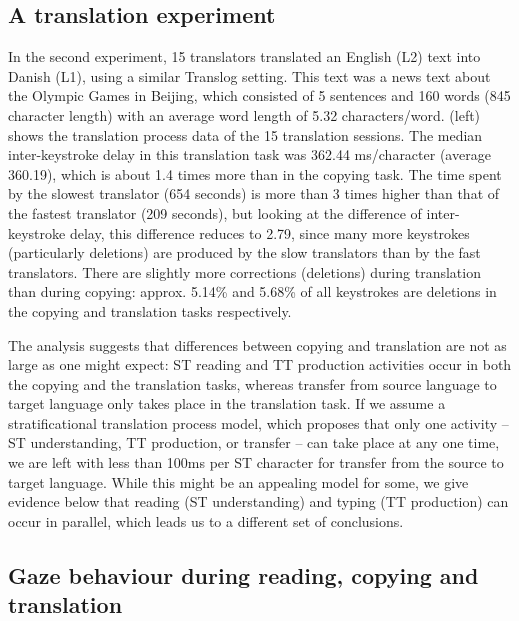\documentclass[output=paper]{LSP/langsci}
\begin{document}
\subsection{A translation experiment}\label{sec:carl:2.2}

In the second experiment, 15 translators translated an English (L2) text into Danish (L1), using a similar Translog setting. This text was a news text about the Olympic Games in Beijing, which consisted of 5 sentences and 160 words (845 character length) with an average word length of 5.32 characters/word.  (left) shows the translation process data of the 15 translation sessions. The median inter-keystroke delay in this translation task was 362.44 ms/character (average 360.19), which is about 1.4 times more than in the copying task. The time spent by the slowest translator (654 seconds) is more than 3 times higher than that of the fastest translator (209 seconds), but looking at the difference of inter-keystroke delay, this difference reduces to 2.79, since many more keystrokes (particularly deletions) are produced by the slow translators than by the fast translators. There are slightly more corrections (deletions) during translation than during copying: approx. 5.14\% and 5.68\% of all keystrokes are deletions in the copying and translation tasks respectively. 

\newpage 
The analysis suggests that differences between copying and translation are not as large as one might expect: ST reading and TT production activities occur in both the copying and the translation tasks, whereas transfer from source language to target language only takes place in the translation task. If we assume a stratificational translation process model, which proposes that only one activity -- ST understanding, TT production, or transfer -- can take place at any one time, we are left with less than 100ms per ST character for transfer from the source to target language. While this might be an appealing model for some, we give evidence below that reading (ST understanding) and typing (TT production) can occur in parallel, which leads us to a different set of conclusions. 

\subsection{Gaze behaviour during reading, copying and translation}\label{sec:carl:2.3}
\end{document}
